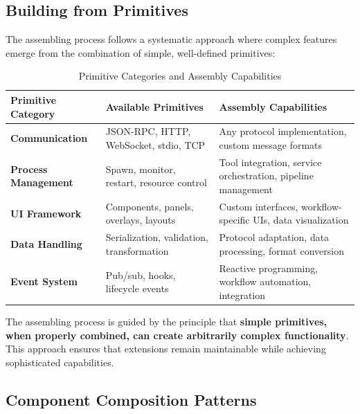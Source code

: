 \subsection*{Building from Primitives}

The assembling process follows a systematic approach where complex features emerge from the combination of simple, well-defined primitives:

\begin{table}[ht]
\centering
\begin{tabular}{@{}p{}p{}p{}@{}}
\toprule
\textbf{Primitive Category} & \textbf{Available Primitives} & \textbf{Assembly Capabilities} \\
\midrule
\textbf{Communication} & 
JSON-RPC, HTTP, WebSocket, stdio, TCP & 
Any protocol implementation, custom message formats \\
\midrule
\textbf{Process Management} & 
Spawn, monitor, restart, resource control & 
Tool integration, service orchestration, pipeline management \\
\midrule
\textbf{UI Framework} & 
Components, panels, overlays, layouts & 
Custom interfaces, workflow-specific UIs, data visualization \\
\midrule
\textbf{Data Handling} & 
Serialization, validation, transformation & 
Protocol adaptation, data processing, format conversion \\
\midrule
\textbf{Event System} & 
Pub/sub, hooks, lifecycle events & 
Reactive programming, workflow automation, integration \\
\bottomrule
\end{tabular}
\caption{Primitive Categories and Assembly Capabilities}
\end{table}

\begin{infobox}[title=Assembly Philosophy]
The assembling process is guided by the principle that \textbf{simple primitives, when properly combined, can create arbitrarily complex functionality}. This approach ensures that extensions remain maintainable while achieving sophisticated capabilities.
\end{infobox}

\subsection*{Component Composition Patterns}

